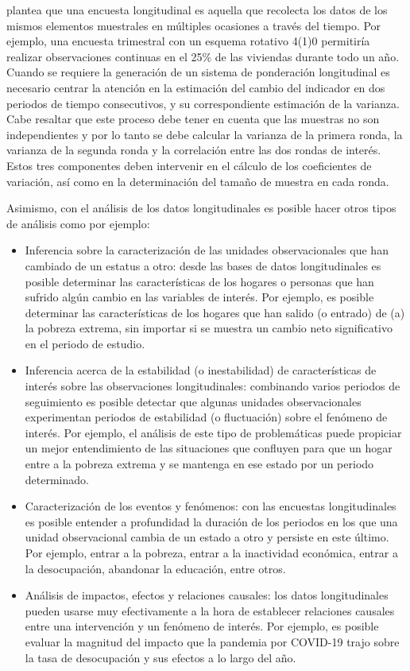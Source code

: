 \documentclass[
  12pt,
]{book}
\providecommand{\tightlist}{%
  \setlength{\itemsep}{0pt}\setlength{\parskip}{0pt}}
\begin{document}
\citet{Lynn_2009} plantea que una encuesta longitudinal es aquella que recolecta los datos de los mismos elementos muestrales en múltiples ocasiones a través del tiempo. Por ejemplo, una encuesta trimestral con un esquema rotativo 4(1)0 permitiría realizar observaciones continuas en el 25\% de las viviendas durante todo un año. Cuando se requiere la generación de un sistema de ponderación longitudinal es necesario centrar la atención en la estimación del cambio del indicador en dos periodos de tiempo consecutivos, y su correspondiente estimación de la varianza. Cabe resaltar que este proceso debe tener en cuenta que las muestras no son independientes y por lo tanto se debe calcular la varianza de la primera ronda, la varianza de la segunda ronda y la correlación entre las dos rondas de interés. Estos tres componentes deben intervenir en el cálculo de los coeficientes de variación, así como en la determinación del tamaño de muestra en cada ronda.

Asimismo, con el análisis de los datos longitudinales es posible hacer otros tipos de análisis como por ejemplo:

\begin{itemize}
\tightlist
\item
  Inferencia sobre la caracterización de las unidades observacionales que han cambiado de un estatus a otro: desde las bases de datos longitudinales es posible determinar las características de los hogares o personas que han sufrido algún cambio en las variables de interés. Por ejemplo, es posible determinar las características de los hogares que han salido (o entrado) de (a) la pobreza extrema, sin importar si se muestra un cambio neto significativo en el periodo de estudio.
\item
  Inferencia acerca de la estabilidad (o inestabilidad) de características de interés sobre las observaciones longitudinales: combinando varios periodos de seguimiento es posible detectar que algunas unidades observacionales experimentan periodos de estabilidad (o fluctuación) sobre el fenómeno de interés. Por ejemplo, el análisis de este tipo de problemáticas puede propiciar un mejor entendimiento de las situaciones que confluyen para que un hogar entre a la pobreza extrema y se mantenga en ese estado por un periodo determinado.
\item
  Caracterización de los eventos y fenómenos: con las encuestas longitudinales es posible entender a profundidad la duración de los periodos en los que una unidad observacional cambia de un estado a otro y persiste en este último. Por ejemplo, entrar a la pobreza, entrar a la inactividad económica, entrar a la desocupación, abandonar la educación, entre otros.
\item
  Análisis de impactos, efectos y relaciones causales: los datos longitudinales pueden usarse muy efectivamente a la hora de establecer relaciones causales entre una intervención y un fenómeno de interés. Por ejemplo, es posible evaluar la magnitud del impacto que la pandemia por COVID-19 trajo sobre la tasa de desocupación y sus efectos a lo largo del año.
\end{itemize}
\end{document}
